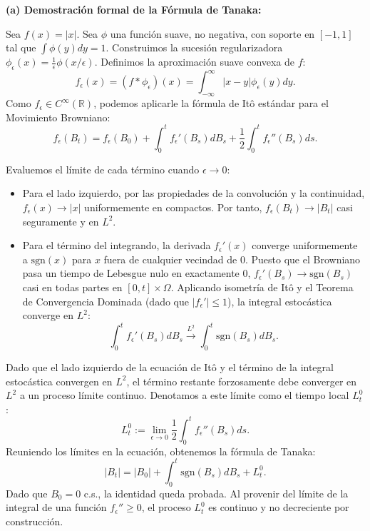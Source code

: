 \documentclass[11pt, letterpaper]{article}
\begin{document}
\begin{solucion}
    \vspace{3mm}
    \textbf{(a) Demostración formal de la Fórmula de Tanaka:}
    
    Sea $f(x) = |x|$. Sea $\phi$ una función suave, no negativa, con soporte en $[-1, 1]$ tal que $\int \phi(y) dy = 1$. Construimos la sucesión regularizadora $\phi_\epsilon(x) = \frac{1}{\epsilon} \phi(x/\epsilon)$.
    Definimos la aproximación suave convexa de $f$:
    \[ f_\epsilon(x) = (f * \phi_\epsilon)(x) = \int_{-\infty}^\infty |x-y| \phi_\epsilon(y) dy. \]
    Como $f_\epsilon \in C^\infty(\mathbb{R})$, podemos aplicarle la fórmula de Itô estándar para el Movimiento Browniano:
    \[ f_\epsilon(B_t) = f_\epsilon(B_0) + \int_0^t f_\epsilon'(B_s) dB_s + \frac{1}{2} \int_0^t f_\epsilon''(B_s) ds. \]
    
    Evaluemos el límite de cada término cuando $\epsilon \to 0$:
    \begin{itemize}
        \item Para el lado izquierdo, por las propiedades de la convolución y la continuidad, $f_\epsilon(x) \to |x|$ uniformemente en compactos. Por tanto, $f_\epsilon(B_t) \to |B_t|$ casi seguramente y en $L^2$.
        \item Para el término del integrando, la derivada $f_\epsilon'(x)$ converge uniformemente a $\text{sgn}(x)$ para $x$ fuera de cualquier vecindad de $0$. Puesto que el Browniano pasa un tiempo de Lebesgue nulo en exactamente $0$, $f_\epsilon'(B_s) \to \text{sgn}(B_s)$ casi en todas partes en $[0,t] \times \Omega$.
        Aplicando isometría de Itô y el Teorema de Convergencia Dominada (dado que $|f_\epsilon'| \le 1$), la integral estocástica converge en $L^2$:
        \[ \int_0^t f_\epsilon'(B_s) dB_s \xrightarrow{L^2} \int_0^t \text{sgn}(B_s) dB_s. \]
    \end{itemize}
    Dado que el lado izquierdo de la ecuación de Itô y el término de la integral estocástica convergen en $L^2$, el término restante forzosamente debe converger en $L^2$ a un proceso límite continuo. Denotamos a este límite como el tiempo local $L_t^0$:
    \[ L_t^0 := \lim_{\epsilon \to 0} \frac{1}{2} \int_0^t f_\epsilon''(B_s) ds. \]
    Reuniendo los límites en la ecuación, obtenemos la fórmula de Tanaka:
    \[ |B_t| = |B_0| + \int_0^t \text{sgn}(B_s) dB_s + L_t^0. \]
    Dado que $B_0 = 0$ c.s., la identidad queda probada. Al provenir del límite de la integral de una función $f_\epsilon'' \ge 0$, el proceso $L_t^0$ es continuo y no decreciente por construcción.
\end{solucion}
\end{document}
